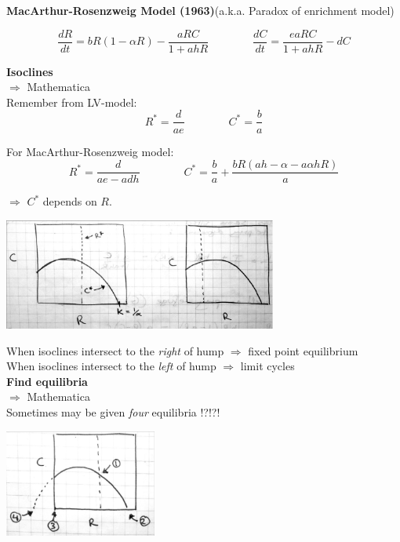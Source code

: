 \documentclass{article}
\newcommand{\note}[1]{\colorbox{gray!30}{#1}}
\newcommand{\ind}{\-\hspace{1cm}}
\begin{document}
\textbf{MacArthur-Rosenzweig Model (1963)}(a.k.a. Paradox of enrichment model)

\begin{equation*}
	\frac{dR}{dt}=bR(1-\alpha R) - \frac{aRC}{1+ahR} \qquad \qquad  \frac{dC}{dt}=\frac{eaRC}{1+ahR}-dC 
\end{equation*}

\textbf{Isoclines}\\
\ind \note{$\Rightarrow$ Mathematica}\\

Remember from LV-model:
\begin{equation*}
	R^*=\frac{d}{ae} \qquad \qquad C^* = \frac{b}{a}
\end{equation*}

For MacArthur-Rosenzweig model:
\begin{equation*}
	R^*=\frac{d}{ae-adh} \qquad \qquad C^* = \frac{b}{a} + \frac{bR(ah-\alpha-a \alpha h R)}{a}
\end{equation*}
\begin{center} $\Rightarrow$ $C^*$ depends on $R$.\end{center}

\begin{center}
\includegraphics[width=9cm]{figs/MRiso.pdf}
\end{center}

When isoclines intersect to the \emph{right} of hump $\Rightarrow$ fixed point equilibrium\\
When isoclines intersect to the \emph{left} of hump $\Rightarrow$ limit cycles\\

\textbf{Find equilibria}\\
\ind \note{$\Rightarrow$ Mathematica}\\
Sometimes may be given \emph{four} equilibria !?!?!
\begin{center}
\includegraphics[width=5cm]{figs/MRiso2.pdf}
\end{center}
\end{document}
